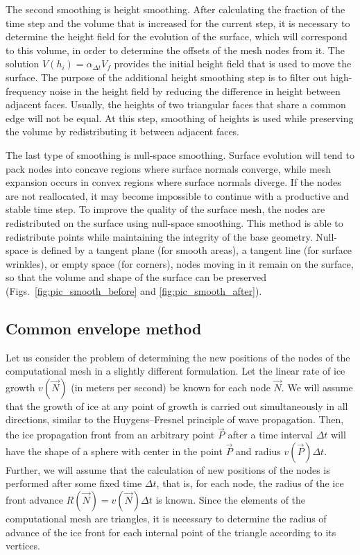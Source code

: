 \documentclass[
11pt,
tightenlines,
twoside,
onecolumn,
nofloats,
nobibnotes,
nofootinbib,
superscriptaddress,
noshowpacs,
centertags]
{revtex4}
\begin{document}
The second smoothing is height smoothing.
After calculating the fraction of the time step and the volume that is increased for the current step, it is necessary to determine the height field for the evolution of the surface, which will correspond to this volume, in order to determine the offsets of the mesh nodes from it.
The solution $V(h_i) = \alpha_{\Delta t} V_f$ provides the initial height field that is used to move the surface.
The purpose of the additional height smoothing step is to filter out high-frequency noise in the height field by reducing the difference in height between adjacent faces.
Usually, the heights of two triangular faces that share a common edge will not be equal.
At this step, smoothing of heights is used while preserving the volume by redistributing it between adjacent faces.

The last type of smoothing is null-space smoothing.
Surface evolution will tend to pack nodes into concave regions where surface normals converge, while mesh expansion occurs in convex regions where surface normals diverge.
If the nodes are not reallocated, it may become impossible to continue with a productive and stable time step.
To improve the quality of the surface mesh, the nodes are redistributed on the surface using null-space smoothing.
This method is able to redistribute points while maintaining the integrity of the base geometry.
Null-space is defined by a tangent plane (for smooth areas),  a
tangent line (for surface wrinkles), or empty space (for corners),
nodes moving in it remain on the surface, so that the volume and
shape of the surface can be preserved
(Figs.~\ref{fig:pic_smooth_before} and \ref{fig:pic_smooth_after}).

\subsection{Common envelope method}
Let us consider the problem of determining the new positions of the
nodes of the computational mesh in a slightly different formulation.
Let the linear rate of ice growth $v(\vec{N})$ (in meters per
second) be  known for each node $\vec{N}$.
We will assume that the growth of ice at any point of growth  is
carried out simultaneously in all directions, similar to the
Huygens--Fresnel principle of wave propagation.
Then, the ice propagation front from an arbitrary point $\vec{P}$
after a time interval $\Delta t$ will have the shape of a sphere
with center in the point $\vec{P}$ and radius $v(\vec{P}) \Delta t$.
Further, we will assume that the calculation of new positions of the nodes is performed after some fixed time $\Delta t$, that is, for each node, the radius of the ice front advance $R(\vec{N}) = v(\vec{N}) \Delta t$ is known.
Since the elements of the computational mesh are triangles, it is
necessary to determine the radius of advance of the ice front for
each internal point of the triangle according to its vertices.
\end{document}
